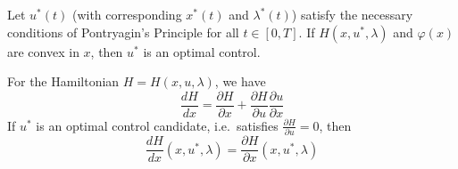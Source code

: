 Let $u^*(t)$ (with corresponding $x^*(t)$ and $\lambda^*(t)$) satisfy the necessary conditions of Pontryagin's Principle for all $t \in [0, T]$. If $H(x, u^*, \lambda)$ and $\varphi(x)$ are convex in $x$, then $u^*$ is an optimal control.


\newpar{}

For the Hamiltonian $H = H(x, u, \lambda)$, we have
\begin{equation*}
    \frac{dH}{dx} = \frac{\partial H}{\partial x} + \frac{\partial H}{\partial u} \frac{\partial u}{\partial x}
\end{equation*}
If $u^*$ is an optimal control candidate, i.e.\ satisfies $\frac{\partial H}{\partial u} = 0$, then
\begin{equation*}
    \frac{dH}{dx}(x, u^*, \lambda) = \frac{\partial H}{\partial x}(x, u^*, \lambda)
\end{equation*}

